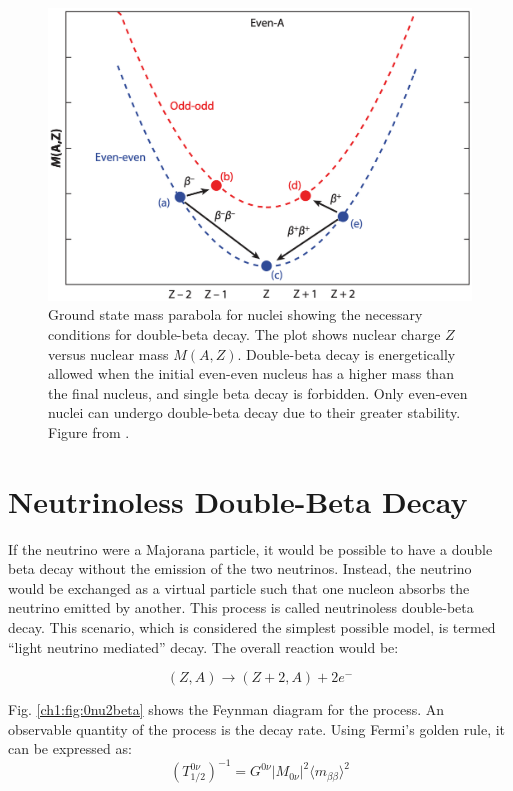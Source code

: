\begin{figure}[!htb]
\centering
\includegraphics[width=0.8\linewidth]{ch1/figs/2nbb_cond.png}
\caption{Ground state mass parabola for nuclei showing the necessary conditions for double-beta decay. The plot shows nuclear charge \(Z\) versus nuclear mass \(M(A,Z)\). Double-beta decay is energetically allowed when the initial even-even nucleus has a higher mass than the final nucleus, and single beta decay is forbidden. Only even-even nuclei can undergo double-beta decay due to their greater stability. Figure from \cite{2nbb_cond}.}
\label{2nbb_cond}

\end{figure}

\section{Neutrinoless Double-Beta Decay}
If the neutrino were a Majorana particle, it would be possible to have a double beta decay without the emission of the two neutrinos. Instead, the neutrino would be exchanged as a virtual particle such that one nucleon absorbs the neutrino emitted by another. This process is called neutrinoless double-beta decay. This scenario, which is considered the simplest possible model, is termed ``light neutrino mediated'' decay. The overall reaction would be:

\begin{equation}\label{0nbeta_decay_eq}
(Z,A) \rightarrow (Z+2,A) + 2e^-
\end{equation}




Fig. \ref{ch1:fig:0nu2beta} shows the Feynman diagram for the process. An observable quantity of the process is the decay rate. Using Fermi's golden rule, it can be expressed as:
\begin{equation}\label{0nbbdecay_rate}
(T^{0\nu}_{1/2})^{-1} = G^{0\nu}\left|M_{0\nu}\right|^2\langle m_{\beta\beta}\rangle^2
\end{equation}

